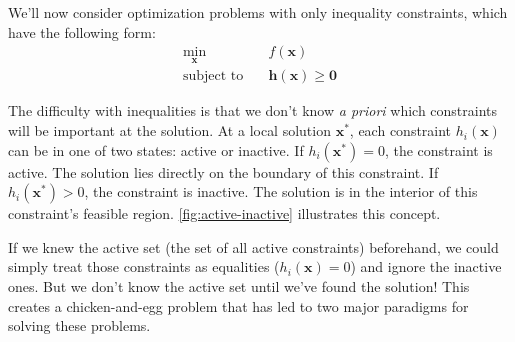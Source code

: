 We'll now consider optimization problems with only inequality constraints, which have the following form:
\begin{equation}
\begin{aligned}
\min_{\mathbf{x}} \quad & f(\mathbf{x}) \\
\text{subject to} \quad & \mathbf{h}(\mathbf{x}) \ge \mathbf{0}
\end{aligned}
\end{equation}

The difficulty with inequalities is that we don't know \emph{a priori} which constraints will be important at the solution. At a local solution $\mathbf{x}^*$, each constraint $h_i(\mathbf{x})$ can be in one of two states: active or inactive. If $h_i(\mathbf{x}^*) = 0$, the constraint is active. The solution lies directly on the boundary of this constraint. If $h_i(\mathbf{x}^*) > 0$, the constraint is inactive. The solution is in the interior of this constraint's feasible region. \autoref{fig:active-inactive} illustrates this concept.

If we knew the active set (the set of all active constraints) beforehand, we could simply treat those constraints as equalities ($h_i(\mathbf{x}) = 0$) and ignore the inactive ones. But we don't know the active set until we've found the solution! This creates a chicken-and-egg problem that has led to two major paradigms for solving these problems.

